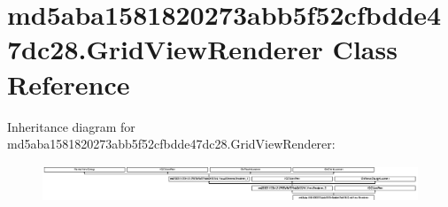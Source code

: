 \hypertarget{classmd5aba1581820273abb5f52cfbdde47dc28_1_1GridViewRenderer}{}\section{md5aba1581820273abb5f52cfbdde47dc28.\+Grid\+View\+Renderer Class Reference}
\label{classmd5aba1581820273abb5f52cfbdde47dc28_1_1GridViewRenderer}
Inheritance diagram for md5aba1581820273abb5f52cfbdde47dc28.\+Grid\+View\+Renderer\+:\begin{figure}[H]
\begin{center}
\leavevmode
\includegraphics[height=1.098039cm]{classmd5aba1581820273abb5f52cfbdde47dc28_1_1GridViewRenderer}
\end{center}
\end{figure}
